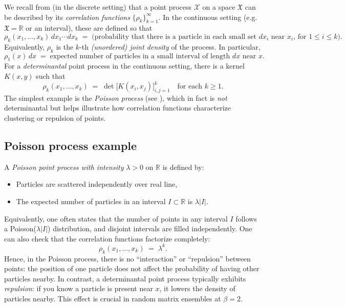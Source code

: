 \documentclass[letterpaper,11pt,oneside,reqno]{article}
\numberwithin{equation}{section}
\theoremstyle{definition}
\begin{document}
We recall from  (in the discrete setting) that a point process \(\mathcal{X}\) on a space \(\mathfrak{X}\) can be described by its \emph{correlation functions} \(\{\rho_k\}_{k=1}^\infty\). In the continuous setting (e.g.\ \(\mathfrak{X}=\mathbb{R}\) or an interval), these are defined so that
\begin{equation}
  \rho_k(x_1,\dots,x_k)\,dx_1\cdots dx_k
  \;=\;
  \text{(probability that there is a particle in each small set $dx_i$ near $x_i$, for $1\le i\le k$)}.
\end{equation}
Equivalently, \(\rho_k\) is the \(k\)-th \emph{(unordered) joint density} of the process.  In particular,
\[
  \rho_1(x)\,dx
  \;=\;
  \text{expected number of particles in a small interval of length $dx$ near $x$.}
\]
For a \emph{determinantal} point process in the continuous setting, there is a kernel \(K(x,y)\) such that
\begin{equation}
  \label{eq:rho-k-dpp-cont}
  \rho_k(x_1,\dots,x_k)
  \;=\;
  \det\bigl[K(x_i,x_j)\bigr]_{i,j=1}^k
  \quad
  \text{for each $k\ge1$}.
\end{equation}
The simplest example is the \emph{Poisson process} (see ), which in fact is \emph{not} determinantal but helps illustrate how correlation functions characterize clustering or repulsion of points.

\subsection{Poisson process example}
\label{subsec:poisson-example}

A \emph{Poisson point process with intensity} \(\lambda>0\) on \(\mathbb{R}\) is defined by:
\begin{itemize}
	\item Particles are scattered independently over real line,
	\item The expected number of particles in an interval \(I\subset \mathbb{R}\) is \(\lambda|I|\).
\end{itemize}
Equivalently, one often states that the number of points in any interval \(I\) follows a Poisson(\(\lambda|I|\)) distribution, and disjoint intervals are filled independently.  One can also check that the correlation functions factorize completely:
\[
\rho_k(x_1,\dots,x_k) \;=\; \lambda^k.
\]
Hence, in the Poisson process, there is no ``interaction'' or ``repulsion'' between points: the position of one particle does not affect the probability of having other particles nearby.  In contrast, a determinantal point process typically exhibits \emph{repulsion}: if you know a particle is present near \(x\), it lowers the density of particles nearby.  This effect is crucial in random matrix ensembles at \(\beta=2\).
\end{document}
